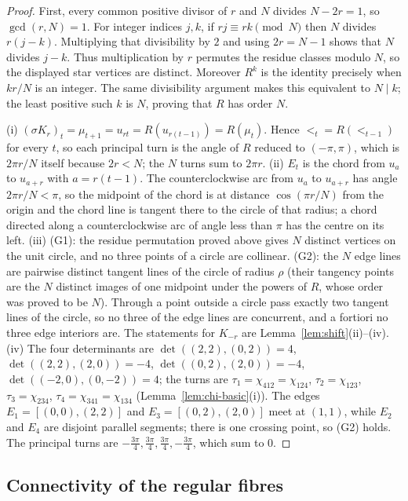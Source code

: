 \begin{proof}
First, every common positive divisor of $r$ and $N$ divides
$N-2r=1$, so $\gcd(r,N)=1$.
For integer indices $j,k$, if $rj\equiv rk\pmod N$ then
$N$ divides $r(j-k)$. Multiplying that divisibility by $2$ and
using $2r=N-1$ shows that $N$ divides $j-k$.
Thus multiplication by $r$ permutes the residue classes modulo $N$,
so the displayed star vertices are distinct.
Moreover $R^k$ is the identity precisely when $kr/N$ is an integer.
The same divisibility argument makes this equivalent to $N\mid k$;
the least positive such $k$ is $N$, proving that $R$ has order $N$.

(i) $(\sigma K_r)_t=\mu_{t+1}=u_{rt}=R(u_{r(t-1)})=R(\mu_t)$. Hence
$\lt_t=R(\lt_{t-1})$ for every $t$, so each principal turn is the angle of
$R$ reduced to $(-\pi,\pi)$, which is $2\pi r/N$ itself because $2r<N$; the
$N$ turns sum to $2\pi r$. (ii) $E_t$ is the chord from $u_a$ to $u_{a+r}$
with $a=r(t-1)$. The counterclockwise arc from $u_a$ to $u_{a+r}$ has angle
$2\pi r/N<\pi$, so the midpoint of the chord is at distance $\cos(\pi r/N)$
from the origin and the chord line is tangent there to the circle of that
radius; a chord directed along a counterclockwise arc of angle less than
$\pi$ has the centre on its left. (iii) (G1): the residue permutation proved above gives $N$ distinct
vertices on the unit circle, and no three points of a circle are collinear.
(G2): the $N$ edge lines are pairwise distinct tangent lines of the circle of
radius $\rho$ (their tangency points are the $N$ distinct images of one
midpoint under the powers of $R$, whose order was proved to be $N$). Through a point
outside a circle pass exactly two tangent lines of the circle, so no three of
the edge lines are concurrent, and a fortiori no three edge interiors are.
The statements for $K_{-r}$ are Lemma~\ref{lem:shift}(ii)--(iv). (iv) The
four determinants are $\det((2,2),(0,2))=4$, $\det((2,2),(2,0))=-4$,
$\det((0,2),(2,0))=-4$, $\det((-2,0),(0,-2))=4$; the turns are
$\tau_1=\chi_{412}=\chi_{124}$, $\tau_2=\chi_{123}$, $\tau_3=\chi_{234}$,
$\tau_4=\chi_{341}=\chi_{134}$ (Lemma~\ref{lem:chi-basic}(i)). The edges
$E_1=[(0,0),(2,2)]$ and $E_3=[(0,2),(2,0)]$ meet at $(1,1)$, while $E_2$ and
$E_4$ are disjoint parallel segments; there is one crossing point, so (G2)
holds. The principal turns are $-\frac{3\pi}4,\frac{3\pi}4,\frac{3\pi}4,-\frac{3\pi}4$,
which sum to $0$.
\end{proof}

\subsection{Connectivity of the regular fibres}

